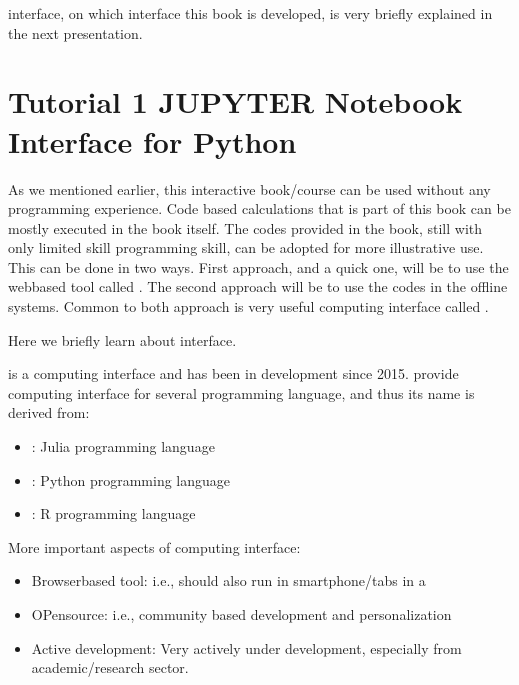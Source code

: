 \documentclass[letterpaper,10pt,english]{sphinxmanual}
\begin{document}
 interface, on which interface this book is developed, is very briefly explained in the next presentation.


\section{Tutorial 1 \sphinxhyphen{} JUPYTER Notebook Interface for Python}
\label{\detokenize{contents/tutorials/tutorial_01/02_jupyter:tutorial-1-jupyter-notebook-interface-for-python}}\label{\detokenize{contents/tutorials/tutorial_01/02_jupyter::doc}}

As we mentioned earlier, this interactive book/course can be used without any programming experience. Code based calculations that is part of this book can be mostly executed in the book itself. The codes provided in the book, still with only limited skill programming skill, can be adopted for more illustrative use. This can be done in two ways. First approach, and a quick one, will be to use the web\sphinxhyphen{}based tool called . The second approach will be to use the codes in the off\sphinxhyphen{}line systems. Common to both approach is very useful computing interface called .

Here we briefly learn about  interface.

 is a computing interface and has been in development since 2015.  provide computing interface for several programming language, and thus its name is derived from:
\begin{itemize}
\item {} 
 : Julia programming language

\item {} 
 : Python programming language

\item {} 
  : R programming language

\end{itemize}

More important aspects of  computing interface:
\begin{itemize}
\item {} 
Browser\sphinxhyphen{}based tool: \sphinxhyphen{} i.e., should also run in smartphone/tabs in a

\item {} 
OPen\sphinxhyphen{}source: i.e., community based development and personalization

\item {} 
Active development: Very actively under development, especially from academic/research sector.

\end{itemize}
\end{document}
